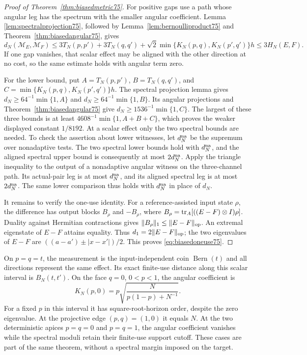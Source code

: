 \begin{proof}[Proof of Theorem~\ref{thm:biasedmetric75}]
For positive gaps use a path whose angular leg has the spectrum
with the smaller angular coefficient.  Lemma
\ref{lem:spectralprojection75}, followed by
Lemma~\ref{lem:bernoulliproduct75} and
Theorem~\ref{thm:biasedangular75}, gives
\[
 d_N(\mathcal M_E,\mathcal M_F)
 \le3T_N(p,p')+3T_N(q,q')
             +\sqrt2\min\{K_N(p,q),K_N(p',q')\}h
 \le3H_N(E,F).
\]
If one gap vanishes, that scalar effect may be aligned with the
other direction at no cost, so the same estimate holds with angular
term zero.

For the lower bound, put $A=T_N(p,p')$, $B=T_N(q,q')$, and
$C=\min\{K_N(p,q),K_N(p',q')\}h$.
The spectral projection lemma gives
$d_N\ge64^{-1}\min\{1,A\}$ and
$d_N\ge64^{-1}\min\{1,B\}$.
Its angular projections and Theorem~\ref{thm:biasedangular75}
give $d_N\ge1536^{-1}\min\{1,C\}$.
The largest of these three bounds is at least
$4608^{-1}\min\{1,A+B+C\}$, which proves the weaker displayed
constant $1/8192$.  At a scalar effect only the two spectral bounds
are needed.  To check the assertion about lower witnesses, let
$d_N^{\rm na}$ be the supremum over nonadaptive tests.  The two
spectral lower bounds hold with $d_N^{\rm na}$, and the aligned
spectral upper bound is consequently at most $2d_N^{\rm na}$.
Apply the triangle inequality to the output of a nonadaptive
angular witness on the three-channel path.  Its actual-pair leg
is at most $d_N^{\rm na}$, and its aligned spectral leg is at most
$2d_N^{\rm na}$.  The same lower comparison thus holds with
$d_N^{\rm na}$ in place of $d_N$.

It remains to verify the one-use identity.  For a reference-assisted
input state $\rho$, the difference has output blocks $B_\rho$ and
$-B_\rho$, where
$B_\rho=\operatorname{tr}_A[((E-F)\otimes I)\rho]$.  Duality against
Hermitian contractions gives
$\|B_\rho\|_1\le\|E-F\|_{\rm op}$.  An extremal eigenstate
of $E-F$ attains equality.  Thus
$d_1=2\|E-F\|_{\rm op}$; the two eigenvalues of $E-F$ are
$((a-a')\pm|x-x'|)/2$.  This proves
\eqref{eq:biasedoneuse75}.
\end{proof}

\begin{remark}
\label{rem:biasedfaces75}
On $p=q=t$, the measurement is the input-independent coin
$\operatorname{Bern}(t)$ and all directions represent the same
effect.  Its exact finite-use distance along this scalar interval is
$B_N(t,t')$.  On the face $q=0$, $0<p<1$, the angular coefficient is
\[
 K_N(p,0)=p\sqrt{\frac{N}{p(1-p)+N^{-1}}}.
\]
For a fixed $p$ in this interval it has square-root-horizon order,
despite the zero eigenvalue.  At the projective edge $(p,q)=(1,0)$
it equals $N$.  At the two deterministic apices $p=q=0$ and
$p=q=1$, the angular coefficient vanishes while the spectral
moduli retain their finite-use support cutoff.  These cases are
part of the same theorem, without a spectral margin imposed on
the target.
\end{remark}
